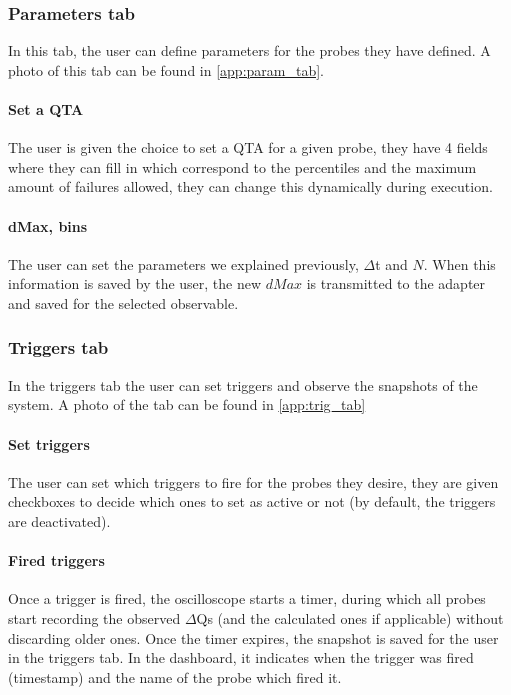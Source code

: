     \subsubsection{Parameters tab}
        In this tab, the user can define parameters for the probes they have defined. A photo of this tab can be found in \cref{app:param_tab}.

    \paragraph{Set a QTA}
        The user is given the choice to set a QTA for a given probe, they have 4 fields where they can fill in which correspond to the percentiles and the maximum amount of failures allowed, they can change this dynamically during execution.

    \paragraph{dMax, bins}
        The user can set the parameters we explained previously, $\Delta$t and $N$. When this information is saved by the user, the new $dMax$ is transmitted to the adapter and saved for the selected observable.

    \subsubsection{Triggers tab}
        In the triggers tab the user can set triggers and observe the snapshots of the system. A photo of the tab can be found in \cref{app:trig_tab}

    \paragraph{Set triggers}
        The user can set which triggers to fire for the probes they desire, they are given checkboxes to decide which ones to set as active or not (by default, the triggers are deactivated).
    
    \paragraph{Fired triggers}
        Once a trigger is fired, the oscilloscope starts a timer, during which all probes start recording the observed $\Delta$Qs (and the calculated ones if applicable) without discarding older ones. Once the timer expires, the snapshot is saved for the user in the triggers tab. In the dashboard, it indicates when the trigger was fired (timestamp) and the name of the probe which fired it.
    
